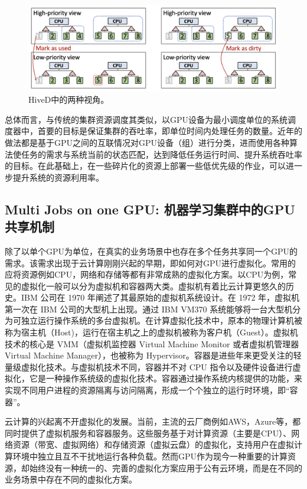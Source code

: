 \begin{figure}[h]
    \centerline{\includegraphics[width=\textwidth]{figures/hived-diff-view.png}}
    \caption{HiveD中的两种视角。}
    \label{hived_diff_view}
\end{figure}

总体而言，与传统的集群资源调度其类似，以GPU设备为最小调度单位的系统调度器中，首要的目标是保证集群的吞吐率，即单位时间内处理任务的数量。近年的做法都是基于GPU之间的互联情况对GPU设备（组）进行分类，进而使用各种算法使任务的需求与系统当前的状态匹配，达到降低任务运行时间、提升系统吞吐率的目标。在此基础上，在一些碎片化的资源上部署一些低优先级的作业，可以进一步提升系统的资源利用率。

\subsection{Multi Jobs on one GPU: 机器学习集群中的GPU共享机制}
除了以单个GPU为单位，在真实的业务场景中也存在多个任务共享同一个GPU的需求。该需求出现于云计算刚刚兴起的早期，即如何对GPU进行虚拟化。常用的应将资源例如CPU，网络和存储等都有非常成熟的虚拟化方案。以CPU为例，常见的虚拟化一般可以分为虚拟机和容器两大类。虚拟机有着比云计算更悠久的历史。IBM 公司在 1970 年阐述了其最原始的虚拟机系统设计。在 1972 年，虚拟机第一次在 IBM 公司的大型机上出现。通过 IBM VM370 系统能够将一台大型机分为可独立运行操作系统的多台虚拟机。在计算虚拟化技术中，原本的物理计算机被称为宿主机（Host)，运行在宿主机之上的虚拟机被称为客户机（Guest）。虚拟机技术的核心是 VMM（虚拟机监控器 Virtual Machine Monitor 或者虚拟机管理器 Virtual Machine Manager），也被称为 Hypervisor。容器是进些年来更受关注的轻量级虚拟化技术。与虚拟机技术不同，容器并不对 CPU 指令以及硬件设备进行虚拟化，它是一种操作系统级的虚拟化技术。容器通过操作系统内核提供的功能，来实现不同用户进程的资源隔离与访问隔离，形成一个个独立的运行时环境，即“容器”。

云计算的兴起离不开虚拟化的发展。当前，主流的云厂商例如AWS，Azure等，都同时提供了虚拟机服务和容器服务。这些服务基于对计算资源（主要是CPU）、网络资源（带宽、虚拟网络）和存储资源（虚拟云盘）的虚拟化，支持用户在虚拟计算环境中独立且互不干扰地运行各种负载。然而GPU作为现今一种重要的计算资源，却始终没有一种统一的、完善的虚拟化方案应用于公有云环境，而是在不同的业务场景中存在不同的虚拟化方案。


